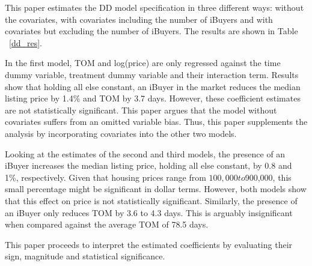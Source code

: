 This paper estimates the DD model specification in three different ways: without the covariates, with covariates including the number of iBuyers and with covariates but excluding the number of iBuyers. The results are shown in Table ~\ref{dd_res}.  

In the first model, TOM and log(price) are only regressed against the time dummy variable, treatment dummy variable and their interaction term. Results show that holding all else constant, an iBuyer in the market reduces the median listing price by 1.4\% and TOM by 3.7 days. However, these coefficient estimates are not statistically significant. This paper argues that the model without covariates suffers from an omitted variable bias. Thus, this paper supplements the analysis by incorporating covariates into the other two models.  

Looking at the estimates of the second and third models, the presence of an iBuyer increases the median listing price, holding all else constant, by 0.8 and 1\%, respectively. Given that housing prices range from $100,000 to $900,000, this small percentage might be significant in dollar terms.  However, both models show that this effect on price is not statistically significant. Similarly, the presence of an iBuyer only reduces TOM by 3.6 to 4.3 days. This is arguably insignificant when compared against the average TOM of 78.5 days. 

This paper proceeds to interpret the estimated coefficients by evaluating their sign, magnitude and statistical significance. 
